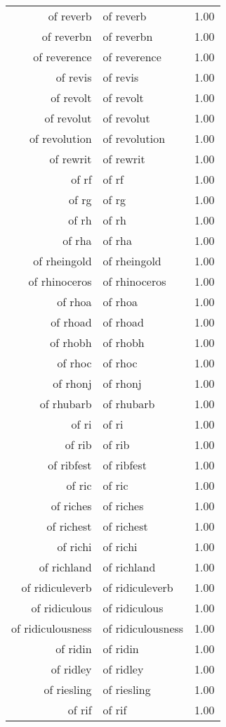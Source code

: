 \begin{table}[ht]
\begin{tabular}{rlr}
  of reverb & of reverb & 1.00 \\ 
  of reverbn & of reverbn & 1.00 \\ 
  of reverence & of reverence & 1.00 \\ 
  of revis & of revis & 1.00 \\ 
  of revolt & of revolt & 1.00 \\ 
  of revolut & of revolut & 1.00 \\ 
  of revolution & of revolution & 1.00 \\ 
  of rewrit & of rewrit & 1.00 \\ 
  of rf & of rf & 1.00 \\ 
  of rg & of rg & 1.00 \\ 
  of rh & of rh & 1.00 \\ 
  of rha & of rha & 1.00 \\ 
  of rheingold & of rheingold & 1.00 \\ 
  of rhinoceros & of rhinoceros & 1.00 \\ 
  of rhoa & of rhoa & 1.00 \\ 
  of rhoad & of rhoad & 1.00 \\ 
  of rhobh & of rhobh & 1.00 \\ 
  of rhoc & of rhoc & 1.00 \\ 
  of rhonj & of rhonj & 1.00 \\ 
  of rhubarb & of rhubarb & 1.00 \\ 
  of ri & of ri & 1.00 \\ 
  of rib & of rib & 1.00 \\ 
  of ribfest & of ribfest & 1.00 \\ 
  of ric & of ric & 1.00 \\ 
  of riches & of riches & 1.00 \\ 
  of richest & of richest & 1.00 \\ 
  of richi & of richi & 1.00 \\ 
  of richland & of richland & 1.00 \\ 
  of ridiculeverb & of ridiculeverb & 1.00 \\ 
  of ridiculous & of ridiculous & 1.00 \\ 
  of ridiculousness & of ridiculousness & 1.00 \\ 
  of ridin & of ridin & 1.00 \\ 
  of ridley & of ridley & 1.00 \\ 
  of riesling & of riesling & 1.00 \\ 
  of rif & of rif & 1.00 \\ 

\end{tabular}
\end{table}
